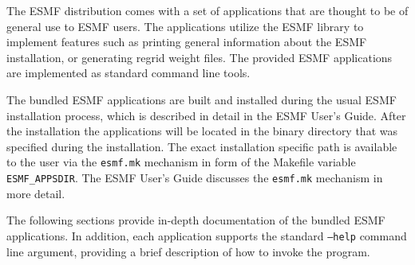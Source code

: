 
The ESMF distribution comes with a set of applications that are thought to be
of general use to ESMF users. The applications utilize the ESMF library to
implement features such as printing general information about the ESMF
installation, or generating regrid weight files. The provided ESMF applications
are implemented as standard command line tools.

The bundled ESMF applications are built and installed during the usual ESMF
installation process, which is described in detail in the ESMF User's Guide. 
After the installation the applications will be located in the binary directory
that was specified during the installation. The exact installation specific
path is available to the user via the {\tt esmf.mk} mechanism in form of the
Makefile variable {\tt ESMF\_APPSDIR}. The ESMF User's Guide discusses the
{\tt esmf.mk} mechanism in more detail.

The following sections provide in-depth documentation of the bundled ESMF
applications. In addition, each application supports the standard {\tt --help}
command line argument, providing a brief description of how to invoke the
program.

